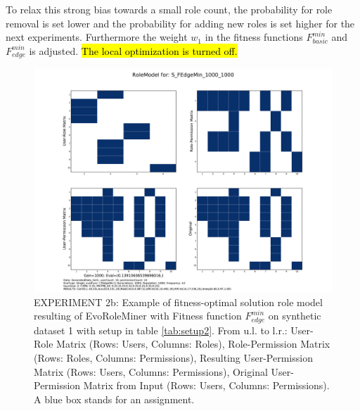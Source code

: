 To relax this strong bias towards a small role count, the probability for role removal is set lower and the probability for adding new roles is set higher for the next experiments. Furthermore the weight $w_1$ in the fitness functions $F_{basic}^{min}$ and $F_{edge}^{min}$ is adjusted. \hl{The local optimization is turned off.}

\begin{figure}[H]
    \centering
    \includegraphics[scale=0.37, trim=4cm 2cm 4cm 2cm, clip=true]{./Figures/exp2edge_RM}
    \caption{EXPERIMENT 2b: Example of fitness-optimal solution role model resulting of EvoRoleMiner with Fitness function $F_{edge}^{min}$ on synthetic dataset 1 with setup in table \ref{tab:setup2}. From u.l. to l.r.: User-Role Matrix (Rows: Users, Columns: Roles), Role-Permission Matrix (Rows: Roles, Columns: Permissions), Resulting User-Permission Matrix (Rows: Users, Columns: Permissions), Original User-Permission Matrix from Input (Rows: Users, Columns: Permissions). A blue box stands for an assignment.}
    \label{fig:exp2edge_RM}
\end{figure}

